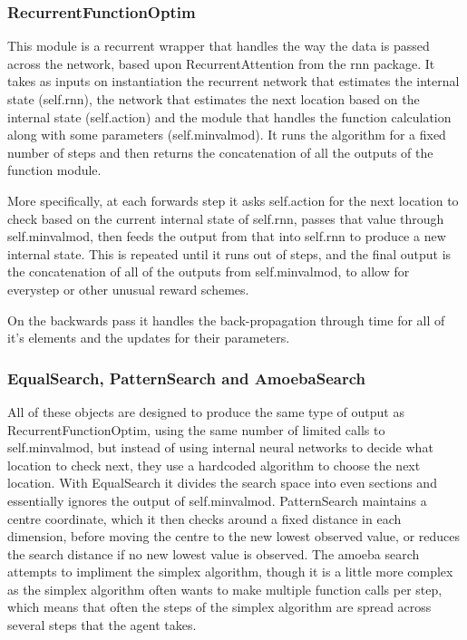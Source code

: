 \subsubsection{RecurrentFunctionOptim}
This module is a recurrent wrapper that handles the way the data is passed across the network, based upon RecurrentAttention from the rnn package. It takes as inputs on instantiation the recurrent network that estimates the internal state (self.rnn), the network that estimates the next location based on the internal state (self.action) and the module that handles the function calculation along with some parameters (self.minvalmod). It runs the algorithm for a fixed number of steps and then returns the concatenation of all the outputs of the function module.

More specifically, at each forwards step it asks self.action for the next location to check based on the current internal state of self.rnn, passes that value through self.minvalmod, then feeds the output from that into self.rnn to produce a new internal state. This is repeated until it runs out of steps, and the final output is the concatenation of all of the outputs from self.minvalmod, to allow for everystep or other unusual reward schemes.

On the backwards pass it handles the back-propagation through time for all of it's elements and the updates for their parameters.

\subsubsection{EqualSearch, PatternSearch and AmoebaSearch}
All of these objects are designed to produce the same type of output as RecurrentFunctionOptim, using the same number of limited calls to self.minvalmod, but instead of using internal neural networks to decide what location to check next, they use a hardcoded algorithm to choose the next location. With EqualSearch it divides the search space into even sections and essentially ignores the output of self.minvalmod. PatternSearch maintains a centre coordinate, which it then checks around a fixed distance in each dimension, before moving  the centre to the new lowest observed value, or reduces the search distance if no new lowest value is observed. The amoeba search attempts to impliment the simplex algorithm, though it is a little more complex as the simplex algorithm often wants to make multiple function calls per step, which means that often the steps of the simplex algorithm are spread across several steps that the agent takes.



